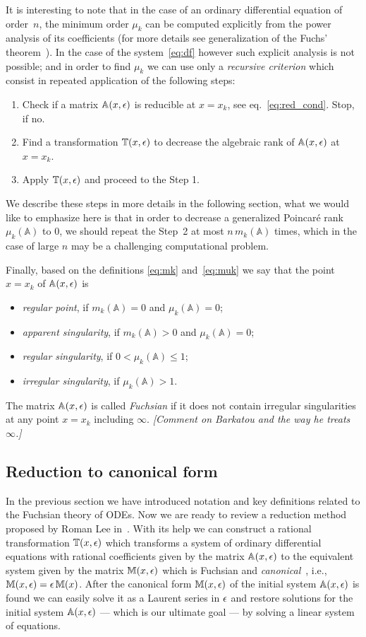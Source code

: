 \documentclass[12pt,a4paper]{article}
\def\M#1{\mathbb{#1}} %
\begin{document}
It is interesting to note that in the case of an ordinary differential equation of order~$n$, the minimum order $\mu_k$ can be computed explicitly from the power analysis of its coefficients (for more details see generalization of the Fuchs' theorem~\cite{Mos59}).
In the case of the system~\eqref{eq:df} however such explicit analysis is not possible; and in order to find $\mu_k$ we can use only a {\em recursive criterion} which consist in repeated application of the following steps:
\begin{enumerate}
  \item Check if a matrix $\M A(x,\eps)$ is reducible at $x=x_k$, see eq.~\eqref{eq:red_cond}. Stop, if no.
  \item Find a transformation $\M T(x,\eps)$ to decrease the algebraic rank of $\M A(x,\eps)$ at $x=x_k$.
  \item Apply $\M T(x,\eps)$ and proceed to the Step 1.
\end{enumerate}
We describe these steps in more details in the following section, what we would like to emphasize here is that in order to decrease a generalized Poincar\'e rank $\mu_k(\M A)$ to 0, we should repeat the Step~2 at most $n\, m_k(\M A)$ times, which in the case of large $n$ may be a challenging computational problem.

Finally, based on the definitions \eqref{eq:mk} and~\eqref{eq:muk} we say that the point $x=x_k$ of $\M A(x,\eps)$ is
\begin{itemize}
  \item {\em regular point}, if $m_k(\M A) = 0$ and $\mu_k(\M A) = 0$;
  \item {\em apparent singularity}, if $m_k(\M A) > 0$ and $\mu_k(\M A) = 0$;
  \item {\em regular singularity}, if $0 < \mu_k(\M A) \le 1$;
  \item {\em irregular singularity}, if $\mu_k(\M A) > 1$.
\end{itemize}
The matrix $\M A(x,\eps)$ is called {\em Fuchsian} if it does not contain irregular singularities at any point $x=x_k$ including $\infty$.
{\em [Comment on Barkatou and the way he treats $\infty$.]}


\subsection{Reduction to canonical form}

In the previous section we have introduced notation and key definitions related to the Fuchsian theory of ODEs.
Now we are ready to review a reduction method proposed by Roman Lee in~\cite{Lee15}.
With its help we can construct a rational transformation $\M T(x,\eps)$ which transforms a system of ordinary differential equations with rational coefficients given by the matrix $\M A(x,\eps)$ to the equivalent system given by the matrix $\M M(x,\eps)$ which is Fuchsian and {\em canonical}~\cite{Henn13}, i.e., $\M M(x,\eps) = \eps\, \M M(x)$.
After the canonical form $\M M(x,\eps)$ of the initial system $\M A(x,\eps)$ is found we can easily solve it as a Laurent series in $\epsilon$ and restore solutions for the initial system $\M A(x,\eps)$ --- which is our ultimate goal --- by solving a linear system of equations.
\end{document}
